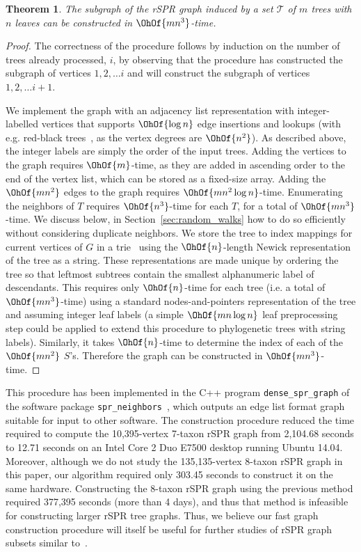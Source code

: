 \documentclass[11pt,onecolumn,conference]{IEEEtran}
\newtheorem{theorem}{Theorem}[section]
\begin{document}
\begin{theorem}
	\label{thm:construct_graph}
	The subgraph of the rSPR graph induced by a set $\mathcal{T}$ of $m$ trees with $n$ leaves can be constructed in $\OhOf{mn^3}$-time.
\end{theorem}
\begin{proof}
	The correctness of the procedure follows by induction on the number of trees already processed, $i$, by observing that the procedure has constructed the subgraph of vertices $1, 2,  \ldots i$ and will construct the subgraph of vertices $1, 2, \ldots i+1$.

	We implement the graph with an adjacency list representation with integer-labelled vertices that supports $\OhOf{\log n}$ edge insertions and lookups (with e.g. red-black trees~\cite{guibas1978dichromatic}, as the vertex degrees are $\OhOf{n^2}$).
	As described above, the integer labels are simply the order of the input trees.
	Adding the vertices to the graph requires $\OhOf{m}$-time, as they are added in ascending order to the end of the vertex list, which can be stored as a fixed-size array.
	Adding the $\OhOf{mn^2}$ edges to the graph requires $\OhOf{mn^2 \log n}$-time.
	Enumerating the neighbors of $T$ requires $\OhOf{n^3}$-time for each $T$, for a total of $\OhOf{mn^3}$-time.
	We discuss below, in Section~\ref{sec:random_walks} how to do so efficiently without considering duplicate neighbors.
	We store the tree to index mappings for current vertices of $G$ in a trie~\cite{fredkin1960trie} using the $\OhOf{n}$-length Newick \cite{wiki:newick} representation of the tree as a string.
	These representations are made unique by ordering the tree so that leftmost subtrees contain the smallest alphanumeric label of descendants.
	This requires only $\OhOf{n}$-time for each tree (i.e. a total of $\OhOf{mn^3}$-time) using a standard nodes-and-pointers representation of the tree and assuming integer leaf labels (a simple $\OhOf{mn\log n}$ leaf preprocessing step could be applied to extend this procedure to phylogenetic trees with string labels).
	Similarly, it takes $\OhOf{n}$-time to determine the index of each of the $\OhOf{mn^2}$ $S$'s.
	Therefore the graph can be constructed in $\OhOf{mn^3}$-time.
\end{proof}

This procedure has been implemented in the C++ program \texttt{dense\_spr\_graph} of the software package \texttt{spr\_neighbors}~\cite{spr_neighbors}, which outputs an edge list format graph suitable for input to other software.
The construction procedure reduced the time required to compute the 10,395-vertex 7-taxon rSPR graph from 2,104.68 seconds to 12.71 seconds on an Intel Core 2 Duo E7500 desktop running Ubuntu 14.04.
Moreover, although we do not study the 135,135-vertex 8-taxon rSPR graph in this paper, our algorithm required only 303.45 seconds to construct it on the same hardware.
Constructing the 8-taxon rSPR graph using the previous method required 377,395 seconds (more than 4 days), and thus that method is infeasible for constructing larger rSPR tree graphs.
Thus, we believe our fast graph construction procedure will itself be useful for further studies of rSPR graph subsets similar to~\cite{Whidden2015-yi}.
\end{document}

